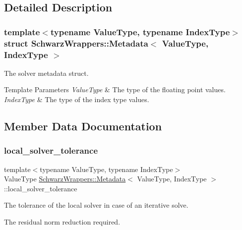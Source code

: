 \subsection{Detailed Description}
\subsubsection*{template$<$typename Value\+Type, typename Index\+Type$>$\newline
struct Schwarz\+Wrappers\+::\+Metadata$<$ Value\+Type, Index\+Type $>$}

The solver metadata struct. 


\begin{DoxyTemplParams}{Template Parameters}
{\em Value\+Type} & The type of the floating point values. \\
\hline
{\em Index\+Type} & The type of the index type values. \\
\hline
\end{DoxyTemplParams}


\subsection{Member Data Documentation}
\mbox{\label{structSchwarzWrappers_1_1Metadata_aeb4194b56ae389b3b836222b42798e7b}} 
\subsubsection{\texorpdfstring{local\+\_\+solver\+\_\+tolerance}{local\_solver\_tolerance}}
{\footnotesize\ttfamily template$<$typename Value\+Type, typename Index\+Type$>$ \\
Value\+Type \hyperlink{structSchwarzWrappers_1_1Metadata}{Schwarz\+Wrappers\+::\+Metadata}$<$ Value\+Type, Index\+Type $>$\+::local\+\_\+solver\+\_\+tolerance}



The tolerance of the local solver in case of an iterative solve. 

The residual norm reduction required. \mbox{\label{structSchwarzWrappers_1_1Metadata_aed5beadd821e0ccb6cea69770e1371f7}} 
